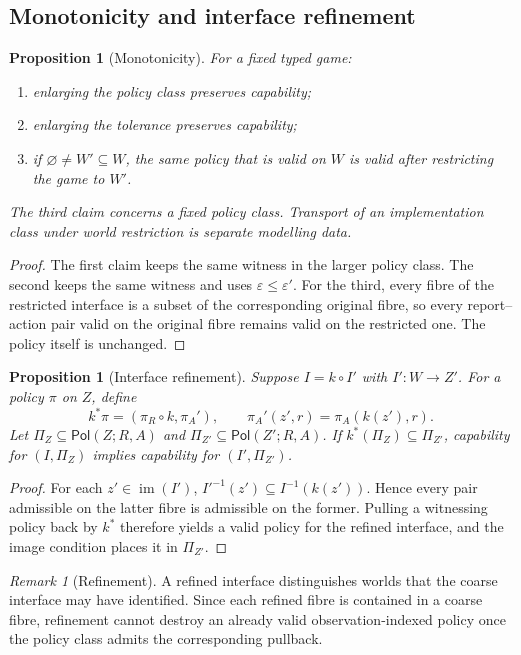 \documentclass[11pt]{article}
\theoremstyle{plain}
\newtheorem{proposition}[theorem]{Proposition}
\theoremstyle{definition}
\theoremstyle{remark}
\newtheorem{remark}[theorem]{Remark}
\newcommand{\im}{\operatorname{im}}
\newcommand{\Pol}{\mathsf{Pol}}
\newcommand{\eps}{\varepsilon}
\begin{document}
\subsection{Monotonicity and interface refinement}

\begin{proposition}[Monotonicity]\label{prop:monotone}
For a fixed typed game:
\begin{enumerate}[label=(\roman*)]
\item enlarging the policy class preserves capability;
\item enlarging the tolerance preserves capability;
\item if $\varnothing\ne W'\subseteq W$, the same policy that is valid on $W$
is valid after restricting the game to $W'$.
\end{enumerate}
The third claim concerns a fixed policy class. Transport of an implementation
class under world restriction is separate modelling data.
\end{proposition}

\begin{proof}
The first claim keeps the same witness in the larger policy class. The second
keeps the same witness and uses $\eps\le\eps'$. For the third, every fibre of the
restricted interface is a subset of the corresponding original fibre, so every
report--action pair valid on the original fibre remains valid on the restricted
one. The policy itself is unchanged.
\end{proof}

\begin{proposition}[Interface refinement]\label{prop:refine}
Suppose $I=k\circ I'$ with $I':W\to Z'$. For a policy $\pi$ on $Z$, define
\[
k^*\pi=(\pi_R\circ k,\pi_A'),\qquad
\pi_A'(z',r)=\pi_A(k(z'),r).
\]
Let $\Pi_Z\subseteq\Pol(Z;R,A)$ and
$\Pi_{Z'}\subseteq\Pol(Z';R,A)$. If
$k^*(\Pi_Z)\subseteq\Pi_{Z'}$, capability for $(I,\Pi_Z)$ implies capability
for $(I',\Pi_{Z'})$.
\end{proposition}

\begin{proof}
For each $z'\in\im(I')$,
$I'^{-1}(z')\subseteq I^{-1}(k(z'))$. Hence every pair admissible on the latter
fibre is admissible on the former. Pulling a witnessing policy back by $k^*$
therefore yields a valid policy for the refined interface, and the image
condition places it in $\Pi_{Z'}$.
\end{proof}

\begin{remark}[Refinement]
A refined interface distinguishes worlds that the coarse interface may have
identified. Since each refined fibre is contained in a coarse fibre, refinement
cannot destroy an already valid observation-indexed policy once the policy class
admits the corresponding pullback.
\end{remark}
\end{document}
